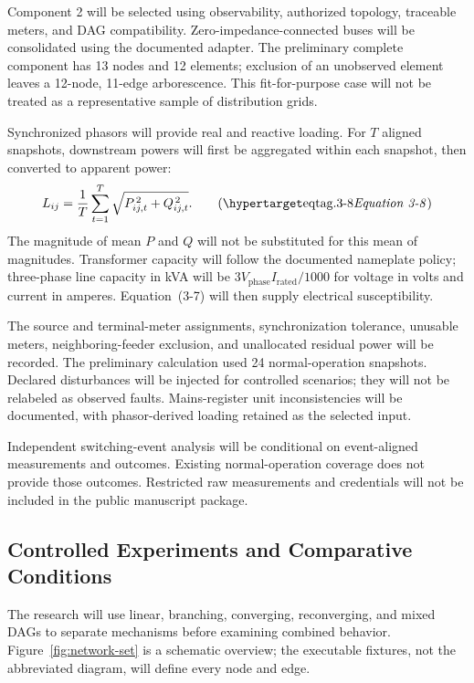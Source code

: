 Component 2 will be selected using observability, authorized topology,
traceable meters, and DAG compatibility. Zero-impedance-connected buses
will be consolidated using the documented adapter. The preliminary complete
component has 13 nodes and 12 elements; exclusion of an unobserved element
leaves a 12-node, 11-edge arborescence. This fit-for-purpose case will not be
treated as a representative sample of distribution grids.

Synchronized phasors will provide real and reactive loading.
For $T$ aligned snapshots, downstream powers will first be aggregated
within each snapshot, then converted to apparent power:
\[
L_{ij}=\frac1T\sum_{t=1}^T
\sqrt{P_{ij,t}^{\,2}+Q_{ij,t}^{\,2}}.
\eqtag{3-8}
\]
The magnitude of mean $P$ and $Q$ will not be substituted for this mean
of magnitudes. Transformer capacity will follow the documented nameplate
policy; three-phase line capacity in kVA will be
$3V_{\mathrm{phase}}I_{\mathrm{rated}}/1000$
for voltage in volts and current in amperes. Equation~(3-7) will then
supply electrical susceptibility.

The source and terminal-meter assignments, synchronization tolerance,
unusable meters, neighboring-feeder exclusion, and unallocated residual
power will be recorded. The preliminary calculation used 24 normal-operation
snapshots. Declared disturbances will be injected for controlled scenarios;
they will not be relabeled as observed faults. Mains-register unit
inconsistencies will be documented, with phasor-derived loading retained
as the selected input.

Independent switching-event analysis will be conditional on event-aligned
measurements and outcomes. Existing normal-operation coverage does not
provide those outcomes. Restricted raw measurements and credentials will
not be included in the public manuscript package.

\subsection{Controlled Experiments and Comparative Conditions}
\label{controlled-experiments}

The research will use linear, branching, converging, reconverging, and
mixed DAGs to separate mechanisms before examining combined behavior.
Figure~\ref{fig:network-set} is a schematic overview; the executable
fixtures, not the abbreviated diagram, will define every node and edge.



